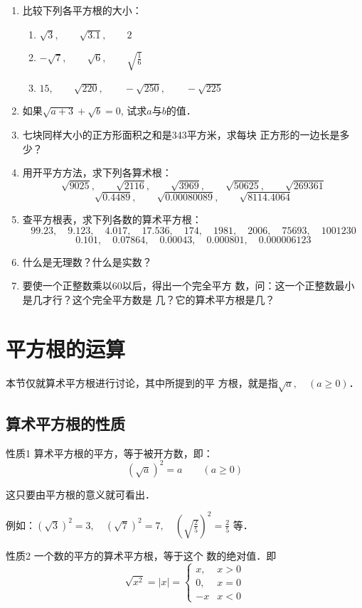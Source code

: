 \begin{enumerate}
\item 比较下列各平方根的大小：
\begin{enumerate}
    \item $\sqrt{3},\qquad \sqrt{3.1},\qquad 2$
    \item $-\sqrt{7},\qquad \sqrt{6},\qquad \sqrt{\frac{1}{6}}$
    \item $15,\qquad \sqrt{220},\qquad -\sqrt{250},\qquad -\sqrt{225}$
\end{enumerate}

\item 如果$\sqrt{a+3}+\sqrt{b}=0$, 试求$a$与$b$的值．
\item 七块同样大小的正方形面积之和是343平方米，求每块
正方形的一边长是多少？
\item 用开平方方法，求下列各算术根：
\[\sqrt{9025},\qquad \sqrt{2116},\qquad \sqrt{3969},\qquad \sqrt{50625},\qquad \sqrt{269361}\]
\[\sqrt{0.4489},\qquad \sqrt{0.00080089},\qquad \sqrt{8114.4064}\]
\item 查平方根表，求下列各数的算术平方根：
\[99.23,\quad 9.123,\quad 4.017,\quad 17.536,\quad 174,\quad 1981,\quad 2006,\quad 
75693,\quad 1001230\]
\[0.101,\quad 0.07864,\quad 0.00043,\quad 0.000801,\quad 
0.000006123\]
\item 什么是无理数？什么是实数？
\item 要使一个正整数乘以60以后，得出一个完全平方
数，问：这一个正整数最小是几才行？这个完全平方数是
几？它的算术平方根是几？
\end{enumerate}

\section{平方根的运算}
本节仅就算术平方根进行讨论，其中所提到的平
方根，就是指$\sqrt{a},\quad (a\ge 0)$．

\subsection{算术平方根的性质}

\begin{blk}{性质1}
    算术平方根的平方，等于被开方数，即：
$$\left(\sqrt{a}\right)^2=a\qquad (a\ge 0)$$
\end{blk}

这只要由平方根的意义就可看出．

例如：$(\sqrt{3})^2=3,\quad (\sqrt{7})^2=7,\quad \left(\sqrt{\frac{2}{5}}\right)^2=\frac{2}{5}$
等．

\begin{blk}{性质2}
    一个数的平方的算术平方根，等于这个
数的绝对值．即
\[\sqrt{x^2}=|x|=\begin{cases}
    x,& x>0\\
    0, &x=0\\
    -x & x<0
\end{cases}\]
\end{blk}

